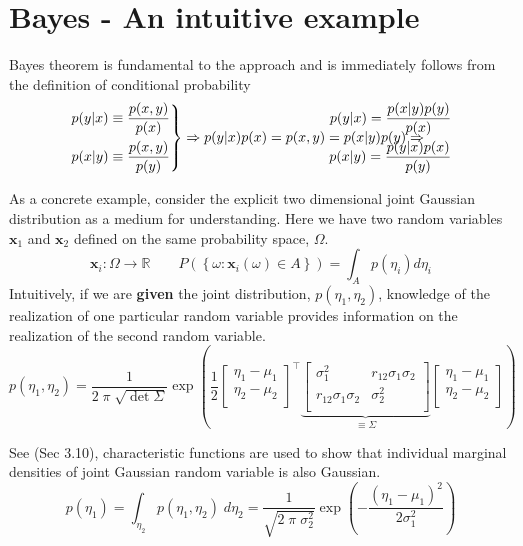 \documentclass{article}         %
\theoremstyle{definition}
\theoremstyle{remark}
\begin{document}
\appendix
\section{Bayes - An intuitive example}
Bayes theorem is fundamental to the approach and is immediately
follows from the definition of conditional probability
\[
\left.
\begin{split}
p(y|x)  \equiv  \frac{p(x,y)}{p(x)}  \\
p(x|y)  \equiv  \frac{p(x,y)}{p(y)} 
\end{split}
\right\}
\Rightarrow
p(y|x) p(x) = p(x,y) = p(x|y) p(y)
\Rightarrow
\hspace{-1in}
\begin{split}
p(y|x)  =\frac{ p(x|y) p(y) }{p(x) } \\
p(x|y)  =\frac{ p(y|x) p(x) }{p(y) } \\
\end{split}
\]

As a concrete example, consider the explicit two dimensional joint Gaussian
distribution as a medium for understanding. Here we have two random
variables $\mathbf{x}_1$ and $\mathbf{x}_2$ defined on the same probability
space, $\Omega$.
\[
\mathbf{x}_i: \Omega \rightarrow \mathbb{R}
\qquad
P\left( \left\{ \omega: 
\mathbf{x}_i (\omega) \in A
 \right\}\right)
=
\int_A p(\eta_i) d\eta_i
\]
Intuitively, if we are \textbf{given} the joint distribution,
$p(\eta_1,\eta_2)$, knowledge of the realization of one particular random
variable provides information on the realization of the second random
variable.
\[
      p(\eta_1,\eta_2)  = \frac{1}{2 \; \pi \; \sqrt{\det{\Sigma}}}
\exp\left( \frac{1}{2}
\begin{bmatrix}
\eta_1 - \mu_1 \\
\eta_2 - \mu_2 \\
\end{bmatrix}^\top
\underbrace{
\begin{bmatrix}
       \sigma_1^2        & r_{12} \sigma_1 \sigma_2 \\
r_{12} \sigma_1 \sigma_2 &          \sigma_2^2 \\
\end{bmatrix}
}_{\equiv \Sigma}
\begin{bmatrix}
\eta_1 - \mu_1 \\
\eta_2 - \mu_2 \\
\end{bmatrix}
\right)
\]

See \cite{maybeck1979stochastic} (Sec 3.10), characteristic functions 
are used to show that individual marginal
densities of joint  Gaussian random variable is also Gaussian.
\[
p(\eta_1) = 
\int_{\eta_2}
      p(\eta_1,\eta_2)
\;d\eta_2
 = \frac{1}{ \sqrt{2 \; \pi \; \sigma_2^2}} \exp\left( - \frac{(\eta_1 -
\mu_1)^2}{2 \sigma_1^2} \right)
\]
\end{document}
